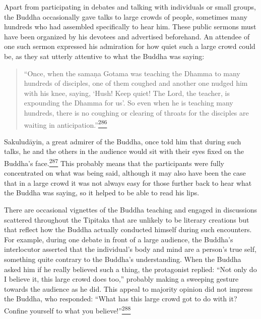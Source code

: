 Apart from participating in debates and talking with individuals or
small groups, the Buddha occasionally gave talks to large crowds of
people, sometimes many hundreds who had assembled specifically to hear
him. These public sermons must have been organized by his devotees and
advertised beforehand. An attendee of one such sermon expressed his
admiration for how quiet such a large crowd could be, as they sat
utterly attentive to what the Buddha was saying:

\begin{quote}
``Once, when the samaṇa Gotama was teaching the Dhamma to many hundreds
of disciples, one of them coughed and another one nudged him with his
knee, saying, `Hush! Keep quiet! The Lord, the teacher, is expounding
the Dhamma for us'. So even when he is teaching many hundreds, there is
no coughing or clearing of throats for the disciples are waiting in
anticipation.''\label{footprints_split_010.html_fnref286}\hyperref[footprints_split_024.htmlux5cux23fn286]{\textsuperscript{286}}
\end{quote}

Sakuludāyin, a great admirer of the Buddha, once told him that during
such talks, he and the others in the audience would sit with their eyes
fixed on the Buddha's
face.\label{footprints_split_010.html_fnref287}\hyperref[footprints_split_024.htmlux5cux23fn287]{\textsuperscript{287}}
This probably means that the participants were fully concentrated on
what was being said, although it may also have been the case that in a
large crowd it was not always easy for those further back to hear what
the Buddha was saying, so it helped to be able to read his lips.

There are occasional vignettes of the Buddha teaching and engaged in
discussions scattered throughout the Tipitaka that are unlikely to be
literary creations but that reflect how the Buddha actually conducted
himself during such encounters. For example, during one debate in front
of a large audience, the Buddha's interlocutor asserted that the
individual's body and mind are a person's true self, something quite
contrary to the Buddha's understanding. When the Buddha asked him if he
really believed such a thing, the protagonist replied: ``Not only do I
believe it, this large crowd does too,'' probably making a sweeping
gesture towards the audience as he did. This appeal to majority opinion
did not impress the Buddha, who responded: ``What has this large crowd
got to do with it? Confine yourself to what you
believe!''\label{footprints_split_010.html_fnref288}\hyperref[footprints_split_024.htmlux5cux23fn288]{\textsuperscript{288}}

